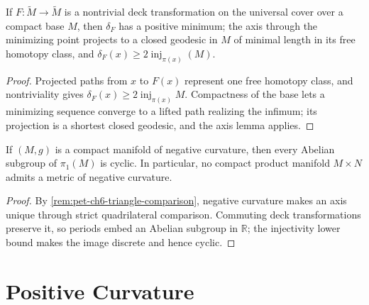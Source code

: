\begin{lemma}
  \label{lem:pet-ch6-deck-transformation-dilation}
  If $F:\tilde M\to\tilde M$ is a nontrivial deck transformation on the
  universal cover over a compact base $M$, then $\delta_F$ has a positive
  minimum; the axis through the minimizing point projects to a closed
  geodesic in $M$ of minimal length in its free homotopy class, and
  $\delta_F(x)\ge2\operatorname{inj}_{\pi(x)}(M)$.
\end{lemma}
\begin{proof}
  \sketch
  Projected paths from \(x\) to \(F(x)\) represent one free homotopy class, and nontriviality gives \(\delta_F(x)\ge2\operatorname{inj}_{\pi(x)}M\). Compactness of the base lets a minimizing sequence converge to a lifted path realizing the infimum; its projection is a shortest closed geodesic, and the axis lemma applies.
\end{proof}

\begin{theorem}
  \label{thm:pet-ch6-preissmann}
  If $(M,g)$ is a compact manifold of negative curvature, then every Abelian
  subgroup of $\pi_1(M)$ is cyclic. In particular, no compact product manifold
  $M\times N$ admits a metric of negative curvature.
\end{theorem}
\begin{proof}
  \sketch
  By \cref{rem:pet-ch6-triangle-comparison}, negative curvature makes an axis unique through strict quadrilateral comparison. Commuting deck transformations preserve it, so periods embed an Abelian subgroup in \(\mathbb R\); the injectivity lower bound makes the image discrete and hence cyclic.
\end{proof}

\section{Positive Curvature}

